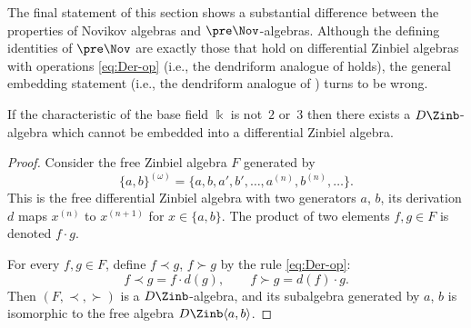 The final statement of this section shows a substantial difference
between the properties of Novikov algebras and $\pre\Nov $-algebras.
Although the defining identities of $\pre\Nov $
are exactly those that hold on differential Zinbiel algebras
with operations \eqref{eq:Der-op}
(i.e.,
the dendriform analogue of \cite[Theorem~7.8]{DzhLofwall2002}
holds),
the general embedding statement (i.e., the dendriform analogue
of \cite[Theorem~3]{BCZ-2017})
turns to be wrong.

\begin{Theorem}%
If the characteristic of the base field $\Bbbk $ is not~$2$ or~$3$
then there exists a $D\Zinb $-algebra which cannot be embedded into a differential Zinbiel algebra.
\end{Theorem}

\begin{proof}
Consider the free Zinbiel algebra $F$ generated
by
\[
\{a,b\}^{(\omega )} = \bigl\{a,b,a',b', \dots, a^{(n)}, b^{(n)}, \dots \bigr\}.
\]
This is the free differential Zinbiel algebra
with two
generators $a$, $b$, its derivation $d$ maps $x^{(n)}$ to $x^{(n+1)}$
for $x\in \{a,b\}$. The product of two elements $f,g\in F$ is denoted
$f\cdot g$.

For every $f,g\in F$, define $f\prec g$, $f\succ g$
by the rule \eqref{eq:Der-op}:
\[
f\prec g = f\cdot d(g),\qquad f\succ g = d(f)\cdot g.
\]
Then $(F,\prec, \succ )$ is a $D\Zinb $-algebra, and its
subalgebra generated by $a$, $b$ is isomorphic to the free algebra $D\Zinb \langle a,b\rangle $.


\end{proof}
